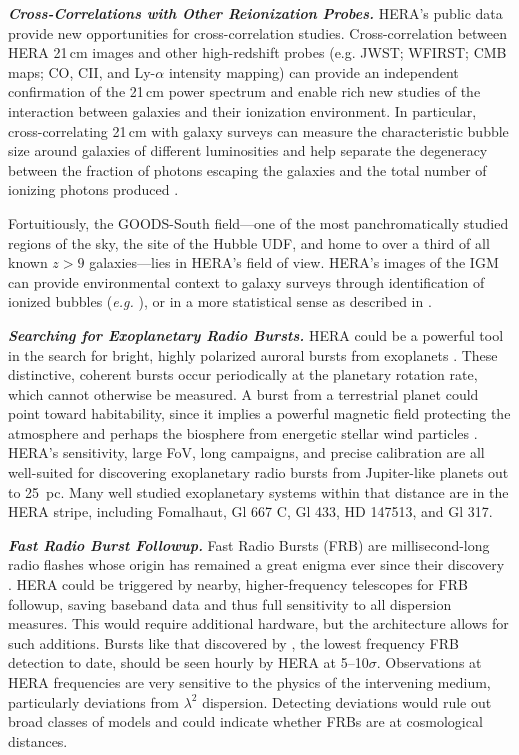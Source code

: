 \documentclass[preprint,11pt]{aastex}
\begin{document}
\emph{\textbf{Cross-Correlations with Other Reionization Probes.}}
\label{sec:crossCorr}
HERA's public data provide new opportunities for cross-correlation studies.
Cross-correlation between HERA 21\,cm images and other high-redshift probes
(e.g. JWST; WFIRST; CMB maps; CO, CII, and Ly-$\alpha$ intensity mapping) 
can provide an independent confirmation of the 21\,cm power spectrum
\citep[i.e.][]{lidz_et_al2009,dore_et_al2014,silva_et_al2015,vrbanec2016} and enable rich new studies of
the interaction between galaxies and their ionization environment. 
In particular, cross-correlating 21\,cm with galaxy surveys can measure the characteristic bubble size around galaxies of
different luminosities \citep{lidz_et_al2009} and help separate the degeneracy
between the fraction of photons escaping the galaxies and the
total number of ionizing photons produced \citep{zackrisson2013}.

Fortuitiously, the GOODS-South field---one of the most panchromatically studied regions of the sky, the site of the Hubble UDF, and home to over a third of all known $z>9$
galaxies---lies in HERA's field of view. HERA's images of the IGM can provide environmental context to galaxy surveys through identification of
ionized bubbles ({\em e.g.} \citealt{malloy_lidz2013}), or in a more statistical sense as
described in \cite{beardsley_et_al2015}.

\textbf{\emph{Searching for Exoplanetary Radio Bursts.}}
\label{sec:exoplanets}
HERA could be a powerful tool in the search for bright, highly polarized auroral bursts
from exoplanets %
\citep{treumann2006,hallinan_et_al2015}. These
distinctive, coherent bursts occur periodically at the planetary
rotation rate, which cannot otherwise be measured. 
A burst from a terrestrial planet could point toward
habitability, since it implies a powerful magnetic field
protecting the atmosphere and perhaps the biosphere from energetic stellar wind
particles \citep{tarter_et_al2007}. HERA's sensitivity, large FoV, long campaigns, and precise calibration are all well-suited
for discovering exoplanetary radio bursts from Jupiter-like planets out to 25~pc. Many well studied exoplanetary systems within that distance are in the HERA stripe, including Fomalhaut, Gl 667 C, Gl 433, HD 147513, and Gl 317.


\textbf{\emph{Fast Radio Burst Followup.}}
\label{sec:FRBs}
Fast Radio Bursts (FRB) are millisecond-long radio flashes whose origin has remained a great enigma ever since their discovery \citep{2007Sci...318..777L}. 
HERA could be triggered by nearby, higher-frequency telescopes for FRB followup, saving baseband data and thus full sensitivity to all dispersion measures.
This would require additional hardware, but the architecture allows for such additions.
Bursts like that discovered by \citet{masui_et_al2015}, the lowest frequency
FRB detection to date, should be seen hourly by HERA at 5--10$\sigma$. %
 Observations at HERA frequencies are very sensitive to the physics of
the intervening medium, particularly deviations from $\lambda^2$
dispersion. Detecting deviations would rule out broad classes of models and could indicate whether FRBs are at cosmological distances.
\end{document}
